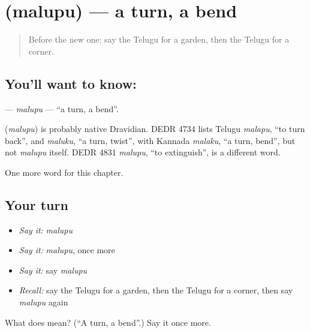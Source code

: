 \section[\texorpdfstring{\te{మలుపు} (malupu)}{మలుపు (malupu)}]{ (malupu) — a turn, a bend}

\label{lesson:TE-C104-malupu}



\begin{quote}
Before the new one: say the Telugu for a garden, then the Telugu for a corner.
\end{quote}

\subsection*{You'll want to know: }
\textbf{} — \emph{malupu} — \textquotedblleft{}a turn, a bend\textquotedblright{}.

\begin{cousinweb}
\textbf{} (\emph{malupu}) is probably native Dravidian. DEDR 4734 lists Telugu \emph{malapu}, \textquotedblleft{}to turn back\textquotedblright{}, and \emph{maluku}, \textquotedblleft{}a turn, twist\textquotedblright{}, with Kannada \emph{malaku}, \textquotedblleft{}a turn, bend\textquotedblright{}, but not \emph{malupu} itself. DEDR 4831 \emph{malupu}, \textquotedblleft{}to extinguish\textquotedblright{}, is a different word.
\end{cousinweb}

\begin{grammarlens}[title={What you've built}]
One more word for this chapter.
\end{grammarlens}

\subsection*{Your turn}
\begin{itemize}
\raggedright
  \item \emph{Say it:} \emph{malupu}
  \item \emph{Say it:} \emph{malupu}, once more
  \item \emph{Say it:} say \emph{malupu}
  \item \emph{Recall:} say the Telugu for a garden, then the Telugu for a corner, then say \emph{malupu} again
\end{itemize}

\begin{tcolorbox}[breakable,colback=teal!4,colframe=teal!35!black,title={Before you move on}]
What does  mean? (\textquotedblleft{}A turn, a bend\textquotedblright{}.) Say it once more.
\end{tcolorbox}

